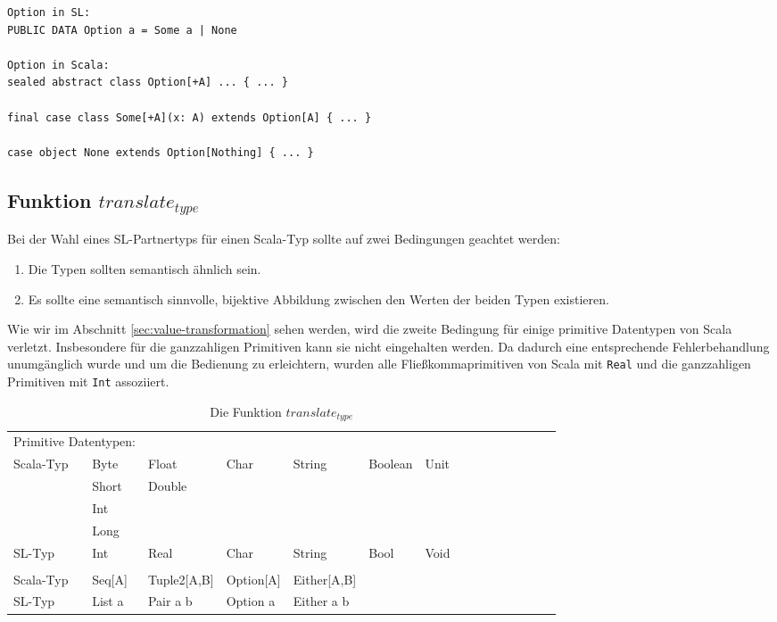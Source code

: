 \documentclass[12pt,bibtotoc]{scrreprt}
\begin{document}
\begin{lstlisting}[caption=Option in SL und Scala, label=lst:option-in-sl-scala, float=h]
Option in SL:
PUBLIC DATA Option a = Some a | None

Option in Scala:
sealed abstract class Option[+A] ... { ... }

final case class Some[+A](x: A) extends Option[A] { ... }

case object None extends Option[Nothing] { ... }
\end{lstlisting}

\subsection{Funktion $translate_{type}$}
\label{subsec:translate_type}


Bei der Wahl eines SL-Partnertyps für einen Scala-Typ sollte auf zwei Bedingungen geachtet werden:

\begin{enumerate}
 \item{Die Typen sollten semantisch ähnlich sein.}
 \item{Es sollte eine semantisch sinnvolle, bijektive Abbildung zwischen den Werten der beiden Typen existieren. }
\end{enumerate}

Wie wir im Abschnitt \ref{sec:value-transformation} sehen werden, wird die zweite Bedingung für einige primitive Datentypen von Scala verletzt. Insbesondere für die ganzzahligen Primitiven kann sie nicht eingehalten werden. Da dadurch eine entsprechende Fehlerbehandlung unumgänglich wurde und um die Bedienung zu erleichtern, wurden alle Fließkommaprimitiven von Scala mit \lstinline!Real! und die ganzzahligen Primitiven mit \lstinline!Int! assoziiert.

\begin{table}[h]
\caption{Die Funktion $translate_{type}$}
\centering
\begin{tabular}{l|llllllllllllll}
\multicolumn{2}{l}{Primitive Datentypen:}\\
Scala-Typ & Byte & Float & Char & String & Boolean & Unit \\
 & Short & Double\\
 & Int\\
 & Long\\
SL-Typ & Int & Real & Char & String & Bool & Void \\
\addlinespace
\multicolumn{2}{l}{Andere:} \\
Scala-Typ & Seq[A] & Tuple2[A,B] & Option[A] & Either[A,B] \\
SL-Typ &  List a & Pair a b & Option a & Either a b \\
\end{tabular}
\label{tab:translate_type}
\end{table}
\end{document}
